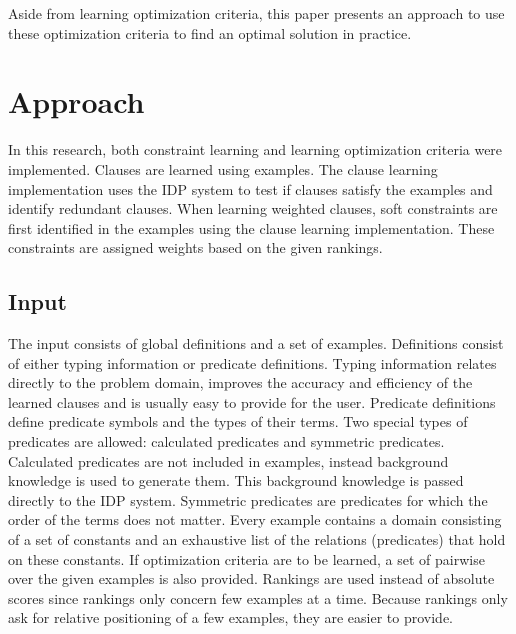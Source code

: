 \documentclass[letterpaper]{article}
\theoremstyle{definition}
\begin{document}
Aside from learning optimization criteria, this paper presents an approach to use these optimization criteria to find an optimal solution in practice.


\section{Approach}
In this research, both constraint learning and learning optimization criteria were implemented.
Clauses are learned using examples.
The clause learning implementation uses the IDP system to test if clauses satisfy the examples and identify redundant clauses.
When learning weighted clauses, soft constraints are first identified in the examples using the clause learning implementation.
These constraints are assigned weights based on the given rankings.

\subsection{Input}
The input consists of global definitions and a set of examples.
Definitions consist of either typing information or predicate definitions.
Typing information relates directly to the problem domain, improves the accuracy and efficiency of the learned clauses and is usually easy to provide for the user.
Predicate definitions define predicate symbols and the types of their terms.
Two special types of predicates are allowed: calculated predicates and symmetric predicates.
Calculated predicates are not included in examples, instead background knowledge is used to generate them.
This background knowledge is passed directly to the IDP system.
Symmetric predicates are predicates for which the order of the terms does not matter.
Every example contains a domain consisting of a set of constants and an exhaustive list of the relations (predicates) that hold on these constants.
If optimization criteria are to be learned, a set of pairwise over the given examples is also provided.
Rankings are used instead of absolute scores since rankings only concern few examples at a time.
Because rankings only ask for relative positioning of a few examples, they are easier to provide.
\end{document}
